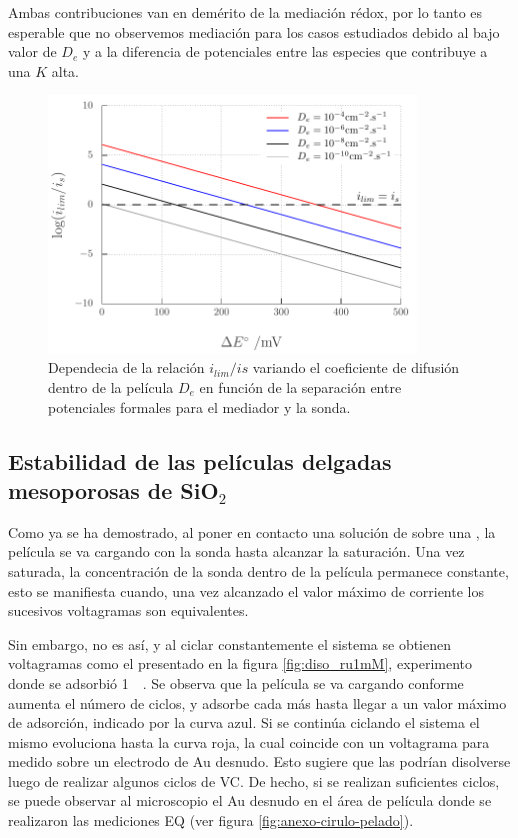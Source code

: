 		Ambas contribuciones van en demérito de la mediación rédox, por lo tanto es esperable que no observemos mediación para los casos estudiados debido al bajo valor de $D_e$ y a la diferencia de potenciales entre las especies que contribuye a una $K$ alta. 	


				\begin{figure}[h!]
				\centering
		 	    \includegraphics[width=0.87\textwidth]{Graficos/ilimite.pdf}
		        \caption[Dependencia de la mediación rédox con $D_e$ y $K$]{Dependecia de la relación $i_{lim}/i{s}$ variando el coeficiente de difusión dentro de la película $D_e$ en función de la separación entre potenciales formales para el mediador y la sonda.}
		        \label{fig:ilimitee}
		      	\end{figure} 

	\subsection{Estabilidad de las películas delgadas mesoporosas de \texorpdfstring{SiO$_2$}{SiO2}}

		Como ya se ha demostrado, al poner en contacto una solución de \ru\space sobre una \pdmF, la película se va cargando con la sonda hasta alcanzar la saturación. Una vez saturada, la concentración de la sonda dentro de la película permanece constante, esto se manifiesta cuando, una vez alcanzado el valor máximo de corriente los sucesivos voltagramas son equivalentes.

		Sin embargo, no es así, y al ciclar constantemente el sistema se obtienen voltagramas como el presentado en la figura \ref{fig:diso_ru1mM}, experimento donde se adsorbió \ru\space \SI{1}{\milli\Molar}. Se observa que la película se va cargando conforme aumenta el número de ciclos, y adsorbe cada más \ru\space hasta llegar a un valor máximo de adsorción, indicado por la curva azul. Si se continúa ciclando el sistema el mismo evoluciona hasta la curva roja, la cual coincide con un voltagrama para \ru\space medido sobre un electrodo de Au desnudo. Esto sugiere que las \pdmF\space podrían disolverse luego de realizar algunos ciclos de VC. De hecho, si se realizan suficientes ciclos, se puede observar al microscopio el Au desnudo en el área de película donde se realizaron las mediciones EQ (ver figura \ref{fig:anexo-cirulo-pelado}).

